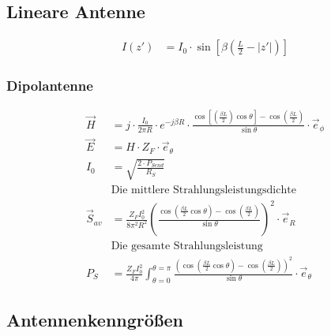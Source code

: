 \subsection{Lineare Antenne}
\begin{align*}
    I(z') & = I_0\cdot\sin\left[\beta\left(\frac{L}{2}-|z'|\right)\right]
\end{align*}

\subsubsection{Dipolantenne}
\begin{align*}
    \vec{H}      & = j\cdot\frac{I_0}{2\pi R}\cdot e^{-j\beta R}\cdot\frac{\cos\left[\left(\frac{\beta L}{2}\right)\cos\theta\right]-\cos\left(\frac{\beta L}{2}\right)}{\sin\theta}\cdot\vec{e}_\phi      \\
    \vec{E}      & = H\cdot Z_F\cdot\vec{e}_\theta                                                                                                                                                         \\
    I_0          & = \sqrt{\frac{2\cdot P_{Send}}{R_S}}                                                                                                                                                    \\
                 & \text{Die mittlere Strahlungsleistungsdichte}                                                                                                                                           \\
    \vec{S}_{av} & = \frac{Z_FI_0^2}{8\pi^2 R^2}\left(\frac{\cos\left(\frac{\beta L}{2}\cos\theta\right)-\cos\left(\frac{\beta L}{2}\right)}{\sin\theta}\right)^2\cdot\vec{e}_R                            \\
                 & \text{Die gesamte Strahlungsleistung}                                                                                                                                                   \\
    P_S          & = \frac{Z_FI_0^2}{4\pi}\int^{\theta=\pi}_{\theta=0}\frac{\left(\cos\left(\frac{\beta L}{2}\cos\theta\right)-\cos\left(\frac{\beta L}{2}\right)\right)^2}{\sin\theta}\cdot\vec{e}_\theta
\end{align*}

\subsection{Antennenkenngrößen}

